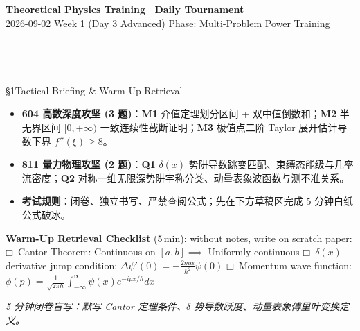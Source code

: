 \documentclass[a4paper,11pt]{article}
\newcommand{\checkbox}{\ensuremath{\mdlgwhtsquare}}
\begin{document}
\clearpage

\begin{center}
  {\LARGE\bfseries\color{navy} Theoretical Physics Training \textperiodcentered\ Daily Tournament}\\[3pt]
  {\small\sffamily\color{mist} 2026-09-02 \quad\textbar\quad Week 1 (Day 3 Advanced) \quad\textbar\quad Phase: Multi-Problem Power Training}\\[-4pt]
  {\color{navy}\rule{\textwidth}{0.8pt}}\\[-11pt]
  {\color{border}\rule{\textwidth}{0.3pt}}
\end{center}

\vspace{-6pt}

\begin{briefing}{\S 1\quad Tactical Briefing \& Warm-Up Retrieval}
\begin{itemize}[leftmargin=1.5em, itemsep=2pt, topsep=1pt]
  \item \textbf{604 高数深度攻坚 (3 题)}：\textbf{M1} 介值定理划分区间 + 双中值倒数和；\textbf{M2} 半无界区间 $[0,+\infty)$ 一致连续性截断证明；\textbf{M3} 极值点二阶 Taylor 展开估计导数下界 $f''(\xi) \ge 8$。
  \item \textbf{811 量力物理攻坚 (2 题)}：\textbf{Q1} $\delta(x)$ 势阱导数跳变匹配、束缚态能级与几率流密度；\textbf{Q2} 对称一维无限深势阱宇称分类、动量表象波函数与测不准关系。
  \item \textbf{考试规则}：闭卷、独立书写、严禁查阅公式；先在下方草稿区完成 5 分钟白纸公式破冰。
\end{itemize}

\vspace{1mm}
\textbf{Warm-Up Retrieval Checklist} (5\,min): without notes, write on scratch paper:\\
\checkbox\ Cantor Theorem: Continuous on $[a,b] \implies$ Uniformly continuous \quad
\checkbox\ $\delta(x)$ derivative jump condition: $\Delta \psi'(0) = -\frac{2m\alpha}{\hbar^2}\psi(0)$ \quad
\checkbox\ Momentum wave function: $\phi(p) = \frac{1}{\sqrt{2\pi\hbar}}\int_{-\infty}^\infty \psi(x) e^{-ipx/\hbar}dx$
\end{briefing}

\vspace{4pt}

\begin{tcolorbox}[
  enhanced, colback=white, colframe=border, boxrule=0.6pt, arc=2mm,
  left=4mm, right=4mm, top=3mm, bottom=3mm,
  fonttitle=\sffamily\bfseries\color{slate},
  title={\raisebox{0pt}{\color{royal}\rule{3pt}{10pt}}\hspace{4pt}Warm-Up Retrieval Workspace \textbar\ 白纸破冰草稿区},
  colbacktitle=paper, coltitle=slate,
  titlerule=0pt, toptitle=2mm, bottomtitle=2mm
]
\textcolor{mist}{\footnotesize\itshape 5 分钟闭卷盲写：默写 Cantor 定理条件、$\delta$ 势导数跃度、动量表象傅里叶变换定义。}
\vspace{10.2cm}
\end{tcolorbox}
\end{document}
